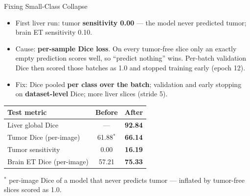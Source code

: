 \documentclass[11pt]{beamer}
\begin{document}
\begin{frame}{Fixing Small-Class Collapse}
    \begin{itemize}
        \item First liver run: tumor \textbf{sensitivity 0.00} --- the model never
              predicted tumor; brain ET sensitivity 0.10.
        \item Cause: \textbf{per-sample Dice loss}. On every tumor-free slice only an
              exactly empty prediction scores well, so ``predict nothing'' wins.
              Per-batch validation Dice then scored those batches as 1.0 and
              stopped training early (epoch 12).
        \item Fix: Dice pooled \textbf{per class over the batch}; validation and early
              stopping on \textbf{dataset-level} Dice; more liver slices (stride 5).
    \end{itemize}
    \begin{table}
        \centering
        \small
        \begin{tabular}{l|c|c}
            \hline
            \textbf{Test metric} & \textbf{Before} & \textbf{After} \\ \hline
            Liver global Dice         & ---   & \textbf{92.84} \\ \hline
            Tumor Dice (per-image)    & 61.88$^\ast$ & \textbf{66.14} \\ \hline
            Tumor sensitivity         & 0.00  & \textbf{16.19} \\ \hline
            Brain ET Dice (per-image) & 57.21 & \textbf{75.33} \\ \hline
        \end{tabular}
    \end{table}
    {\scriptsize $^\ast$ per-image Dice of a model that never predicts tumor --- inflated by tumor-free slices scored as 1.0.}
\end{frame}
\end{document}
